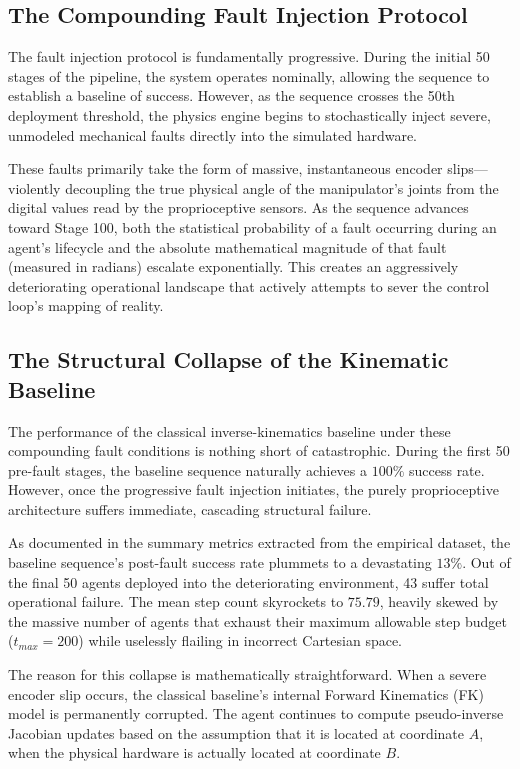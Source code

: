 \documentclass[12pt,a4paper,oneside]{report}
\begin{document}
\subsection{The Compounding Fault Injection Protocol}

The fault injection protocol is fundamentally progressive. During the initial 50 stages of the pipeline, the system operates nominally, allowing the sequence to establish a baseline of success. However, as the sequence crosses the 50th deployment threshold, the physics engine begins to stochastically inject severe, unmodeled mechanical faults directly into the simulated hardware. 

These faults primarily take the form of massive, instantaneous encoder slips—violently decoupling the true physical angle of the manipulator's joints from the digital values read by the proprioceptive sensors. As the sequence advances toward Stage 100, both the statistical probability of a fault occurring during an agent's lifecycle and the absolute mathematical magnitude of that fault (measured in radians) escalate exponentially. This creates an aggressively deteriorating operational landscape that actively attempts to sever the control loop's mapping of reality.

\subsection{The Structural Collapse of the Kinematic Baseline}

The performance of the classical inverse-kinematics baseline under these compounding fault conditions is nothing short of catastrophic. During the first 50 pre-fault stages, the baseline sequence naturally achieves a $100\%$ success rate. However, once the progressive fault injection initiates, the purely proprioceptive architecture suffers immediate, cascading structural failure.

As documented in the summary metrics extracted from the empirical dataset, the baseline sequence's post-fault success rate plummets to a devastating $13\%$. Out of the final 50 agents deployed into the deteriorating environment, 43 suffer total operational failure. The mean step count skyrockets to $75.79$, heavily skewed by the massive number of agents that exhaust their maximum allowable step budget ($t_{max} = 200$) while uselessly flailing in incorrect Cartesian space.

The reason for this collapse is mathematically straightforward. When a severe encoder slip occurs, the classical baseline's internal Forward Kinematics (FK) model is permanently corrupted. The agent continues to compute pseudo-inverse Jacobian updates based on the assumption that it is located at coordinate $A$, when the physical hardware is actually located at coordinate $B$. 
\end{document}
